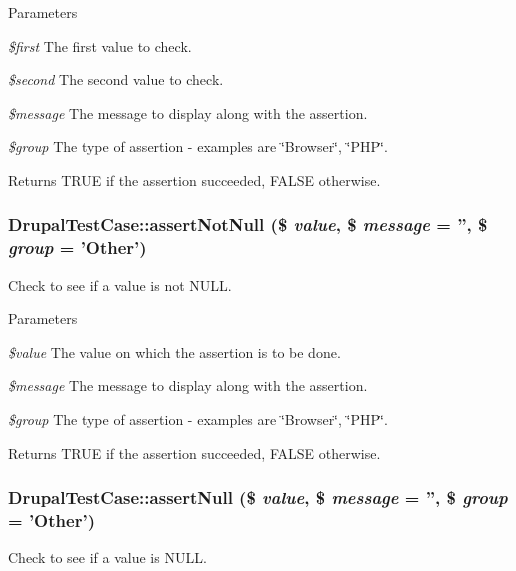 \begin{DoxyParams}{Parameters}
\item[{\em \$first}]The first value to check. \item[{\em \$second}]The second value to check. \item[{\em \$message}]The message to display along with the assertion. \item[{\em \$group}]The type of assertion -\/ examples are \char`\"{}Browser\char`\"{}, \char`\"{}PHP\char`\"{}. \end{DoxyParams}
\begin{DoxyReturn}{Returns}
TRUE if the assertion succeeded, FALSE otherwise. 
\end{DoxyReturn}
\hypertarget{class_drupal_test_case_a94d00b7ee53b58205fe55ddc9bff788a}{
\subsubsection[{assertNotNull}]{\setlength{\rightskip}{0pt plus 5cm}DrupalTestCase::assertNotNull (\$ {\em value}, \/  \$ {\em message} = {\ttfamily ''}, \/  \$ {\em group} = {\ttfamily 'Other'})}}
\label{class_drupal_test_case_a94d00b7ee53b58205fe55ddc9bff788a}
Check to see if a value is not NULL.


\begin{DoxyParams}{Parameters}
\item[{\em \$value}]The value on which the assertion is to be done. \item[{\em \$message}]The message to display along with the assertion. \item[{\em \$group}]The type of assertion -\/ examples are \char`\"{}Browser\char`\"{}, \char`\"{}PHP\char`\"{}. \end{DoxyParams}
\begin{DoxyReturn}{Returns}
TRUE if the assertion succeeded, FALSE otherwise. 
\end{DoxyReturn}
\hypertarget{class_drupal_test_case_ab04d0a088003f5e7aac49a4888710cc8}{
\subsubsection[{assertNull}]{\setlength{\rightskip}{0pt plus 5cm}DrupalTestCase::assertNull (\$ {\em value}, \/  \$ {\em message} = {\ttfamily ''}, \/  \$ {\em group} = {\ttfamily 'Other'})}}
\label{class_drupal_test_case_ab04d0a088003f5e7aac49a4888710cc8}
Check to see if a value is NULL.


